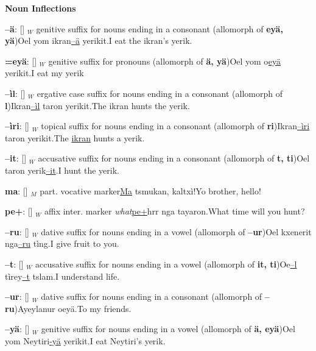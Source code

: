 \documentclass[11pt]{article}
\newcommand{\marker}[4]{\par\textbf{#1}: [\textipa{#2}] $_{#4}$ #3}
\newcommand{\alloffix}[6]{\par\textbf{#1}: [\textipa{#2}] $_{#6}$ #4 suffix for nouns ending in a #5 (allomorph of \textbf{#3})}
\newcommand{\alloffixx}[6]{\par\textbf{#1}: [\textipa{#2}] $_{#6}$ #4 suffix for #5 (allomorph of \textbf{#3})}
\begin{document}
\noindent\textbf{Noun Inflections}\begin{multicols}{2}{\begin{hangparas}{.5cm}{1}\noindent
\alloffix{--\"a}{\ae}{ey\"a, y\"a}{genitive}{consonant}{W}{Oel yom ikran\uline{--\"a} yerikit.}{I eat the ikran's yerik.}
\alloffixx{=ey\"a}{Ej\ae}{\"a, y\"a}{genitive}{pronouns}{W}{Oel yom o\uline{ey\"a} yerikit.}{I eat my yerik}
\alloffix{--\`il}{Il}{l}{ergative case}{consonant}{W}{Ikran\uline{--\`il} taron yerikit.}{The ikran hunts the yerik.}
\alloffix{--\`iri}{IRi}{ri}{topical}{consonant}{W}{Ikran\uline{--\`iri} taron yerikit.}{The \uline{ikran} hunts a yerik.}
\alloffix{--it}{it\textcorner}{t, ti}{accusative}{consonant}{W}{Oel taron yerik\uline{--it}.}{I hunt the yerik.}
\marker{ma}{ma}{part. vocative marker}{M}{\uline{Ma} tsmukan, kaltx\`i!}{Yo brother, hello!}
\marker{pe+}{pE}{affix inter. marker \textit{what}}{W}{\uline{pe+}hrr nga tayaron.}{What time will you hunt?}
\alloffix{--ru}{Ru}{--ur}{dative}{vowel}{W}{Oel kxenerit nga\uline{--ru} t\`ing.}{I give fruit to you.}
\alloffix{--t}{t\textcorner}{it, ti}{accusative}{vowel}{W}{Oe\uline{--l} t\`irey\uline{--t} tslam.}{I understand life.}
\alloffix{--ur}{ur}{--ru}{dative}{consonant}{W}{Ayeylanur oey\"a.}{To my friends.}
\alloffix{--y\"a}{j\ae}{\"a, ey\"a}{genitive}{vowel}{W}{Oel yom Neytiri\uline{-y\"a} yerikit.}{I eat Neytiri's yerik.}
\end{hangparas} }\end{multicols}
\end{document}
